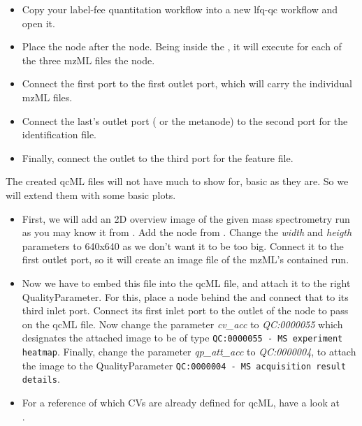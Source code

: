 \begin{itemize} 
\item Copy your label-fee quantitation workflow into a new lfq-qc workflow and open it.
\item Place the  node after the  node. Being inside the , it will execute for each of the three mzML files the  node.
\item Connect the first  port to the first  outlet port, which will carry the individual mzML files.
\item Connect the last's  outlet port ( or the  metanode) to the second  port for the identification file.
\item Finally, connect the  outlet to the third  port for the feature file.
\end{itemize}

The created qcML files will not have much to show for, basic as they are. So we will extend them with some basic plots.
\begin{itemize}
\item First, we will add an 2D overview image of the given mass spectrometry run as you may know it from . Add the  node from . Change the \textit{width} and \textit{heigth} parameters to 640x640 as we don't want it to be too big. Connect it to the first  outlet port, so it will create an image file of the mzML's contained run.
\item Now we have to embed this file into the qcML file, and attach it to the right QualityParameter. For this, place a  node behind the  and connect that to its third inlet port. Connect its first inlet port to the outlet of the  node to pass on the qcML file. Now change the parameter \textit{cv\_acc} to \textit{QC:0000055} which designates the attached image to be of type  \texttt{QC:0000055 - MS experiment heatmap}.
Finally, change the parameter \textit{qp\_att\_acc} to \textit{QC:0000004}, to attach the image to the QualityParameter \texttt{QC:0000004 - MS acquisition result details}.
\item For a reference of which CVs are already defined for qcML, have a look at \\ .
\end{itemize}

